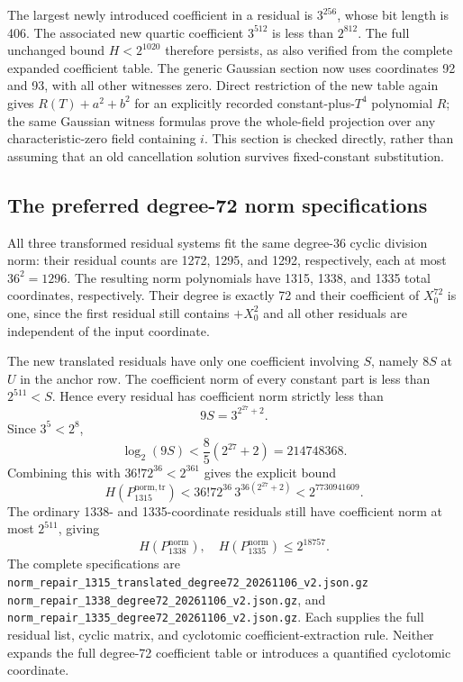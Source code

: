 The largest newly introduced coefficient in a residual is
$3^{256}$, whose bit length is 406.  The associated new
quartic coefficient $3^{512}$ is less than $2^{812}$.
The full unchanged bound $H<2^{1020}$ therefore persists,
as also verified from the complete expanded coefficient
table.  The generic Gaussian section now uses coordinates
92 and 93, with all other witnesses zero.  Direct restriction
of the new table again gives $R(T)+a^2+b^2$ for an explicitly
recorded constant-plus-$T^4$ polynomial $R$; the same Gaussian
witness formulas prove the whole-field projection over any
characteristic-zero field containing $i$.  This section is
checked directly, rather than assuming that an old
cancellation solution survives fixed-constant substitution.

\subsection{The preferred degree-72 norm specifications}

All three transformed residual systems fit the same degree-36
cyclic division norm: their residual counts are 1272, 1295,
and 1292, respectively, each at most $36^2=1296$.
The resulting norm polynomials have 1315, 1338, and 1335 total
coordinates, respectively.  Their degree is exactly 72 and
their coefficient of $X_0^{72}$ is one, since the first
residual still contains $+X_0^2$ and all other residuals
are independent of the input coordinate.

The new translated residuals have only one coefficient
involving $S$, namely $8S$ at $U$ in the anchor row.  The
coefficient norm of every constant part is less than
$2^{511}<S$.  Hence every residual has coefficient norm
strictly less than
\[
                            9S=3^{2^{27}+2}.
\]
Since $3^5<2^8$,
\[
               \log_2(9S)<\frac85(2^{27}+2)=214748368.
\]
Combining this with $36!72^{36}<2^{361}$ gives the explicit
bound
\[
 H(P_{1315}^{\mathrm{norm,tr}})
    <36!72^{36}\,3^{36(2^{27}+2)}
    <2^{7730941609}.
\]
The ordinary 1338- and 1335-coordinate residuals still have coefficient
norm at most $2^{511}$, giving
\[
                       H(P_{1338}^{\mathrm{norm}}),\quad
                       H(P_{1335}^{\mathrm{norm}})
                                         \le2^{18757}.
\]
The complete specifications are
\nolinkurl{norm_repair_1315_translated_degree72_20261106_v2.json.gz}
\nolinkurl{norm_repair_1338_degree72_20261106_v2.json.gz},
and
\nolinkurl{norm_repair_1335_degree72_20261106_v2.json.gz}.
Each supplies the full residual list, cyclic matrix, and
cyclotomic coefficient-extraction rule.  Neither expands
the full degree-72 coefficient table or introduces a
quantified cyclotomic coordinate.

